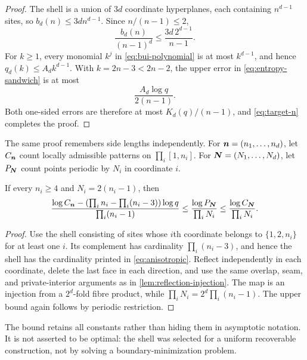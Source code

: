 \begin{proof}
The shell is a union of $3d$ coordinate hyperplanes, each containing
$n^{d-1}$ sites, so $b_d(n)\le3dn^{d-1}$.  Since $n/(n-1)\le2$,
\[
 \frac{b_d(n)}{(n-1)^d}
 \le \frac{3d\,2^{d-1}}{n-1}.
\]
For $k\ge1$, every monomial $k^j$ in \cref{eq:bui-polynomial} is at most
$k^{d-1}$, and hence $q_d(k)\le A_dk^{d-1}$.  With
$k=2n-3<2n-2$, the upper error in \cref{eq:entropy-sandwich} is at most
\[
 \frac{A_d\log q}{2(n-1)}.
\]
Both one-sided errors are therefore at most $K_d(q)/(n-1)$, and
\cref{eq:target-n} completes the proof.
\end{proof}

The same proof remembers side lengths independently.  For
$\boldsymbol{n}=(n_1,\ldots,n_d)$, let $C_{\boldsymbol{n}}$ count locally admissible patterns on
$\prod_i[1,n_i]$.  For $\boldsymbol{N}=(N_1,\ldots,N_d)$, let $P_{\boldsymbol{N}}$ count points
periodic by $N_i$ in coordinate $i$.

\begin{corollary}
\label{cor:anisotropic}
If every $n_i\ge4$ and $N_i=2(n_i-1)$, then
\begin{equation}
\frac{\log C_{\boldsymbol{n}}-\left(\prod_i n_i-\prod_i(n_i-3)\right)\log q}
     {\prod_i(n_i-1)}
\le \frac{\log P_{\boldsymbol{N}}}{\prod_iN_i}
\le \frac{\log C_{\boldsymbol{N}}}{\prod_iN_i}.
\label{eq:anisotropic}
\end{equation}
\end{corollary}

\begin{proof}
Use the shell consisting of sites whose $i$th coordinate belongs to
$\{1,2,n_i\}$ for at least one $i$.  Its complement has cardinality
$\prod_i(n_i-3)$, and hence the shell has the cardinality printed in
\cref{eq:anisotropic}.  Reflect independently in each coordinate, delete the
last face in each direction, and use the same overlap, seam, and
private-interior arguments as in \cref{lem:reflection-injection}.  The map is
an injection from a $2^d$-fold fibre product, while
$\prod_iN_i=2^d\prod_i(n_i-1)$.  The upper bound again follows by periodic
restriction.
\end{proof}

\begin{remark}
The bound retains all constants rather than hiding them in asymptotic
notation.  It is not asserted to be optimal: the shell was selected for a
uniform recoverable construction, not by solving a boundary-minimization
problem.
\end{remark}
